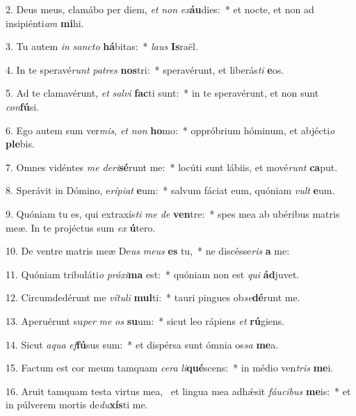 2. Deus meus, clamábo per diem, \textit{et} \textit{non} \textit{ex}\textbf{áu}dies:~*  et nocte, et non ad insipiénti\textit{am} \textbf{mi}hi.\

3. Tu autem \textit{in} \textit{sanc}\textit{to} \textbf{há}bitas:~*  \textit{laus} \textbf{Is}raël.\

4. In te speravé\textit{runt} \textit{pa}\textit{tres} \textbf{nos}tri:~*  speravérunt, et liberás\textit{ti} \textbf{e}os.\

5. Ad te clamavérunt, \textit{et} \textit{sal}\textit{vi} \textbf{fac}ti sunt:~*  in te speravérunt, et non sunt \textit{con}\textbf{fú}si.\

6. Ego autem sum ver\textit{mis}, \textit{et} \textit{non} \textbf{ho}mo:~*  oppróbrium hóminum, et abjécti\textit{o} \textbf{ple}bis.\

7. Omnes vidéntes \textit{me} \textit{de}\textit{ri}\textbf{sé}runt me:~*  locúti sunt lábiis, et mové\textit{runt} \textbf{ca}put.\

8. Sperávit in Dómino, e\textit{rí}\textit{pi}\textit{at} \textbf{e}um:~*  salvum fáciat eum, quóniam \textit{vult} \textbf{e}um.\

9. Quóniam tu es, qui extraxís\textit{ti} \textit{me} \textit{de} \textbf{ven}tre:~*  spes mea ab ubéribus matris meæ. In te projéctus sum \textit{ex} \textbf{ú}tero.\

10. De ventre matris meæ De\textit{us} \textit{me}\textit{us} \textbf{es} tu,~*  ne discésse\textit{ris} \textbf{a} me:\

11. Quóniam tribuláti\textit{o} \textit{pró}\textit{xi}\textbf{ma} est:~*  quóniam non est \textit{qui} \textbf{ád}juvet.\

12. Circumdedérunt me \textit{ví}\textit{tu}\textit{li} \textbf{mul}ti:~*  tauri pingues ob\textit{se}\textbf{dé}runt me.\

13. Aperuérunt su\textit{per} \textit{me} \textit{os} \textbf{su}um:~*  sicut leo rápiens \textit{et} \textbf{rú}giens.\

14. Sicut \textit{a}\textit{qua} \textit{ef}\textbf{fú}sus sum:~*  et dispérsa sunt ómnia os\textit{sa} \textbf{me}a.\

15. Factum est cor meum tamquam \textit{ce}\textit{ra} \textit{li}\textbf{qué}scens:~*  in médio ven\textit{tris} \textbf{me}i.\

16. Aruit tamquam testa virtus mea, \dag\  et lingua mea adhǽsit \textit{fáu}\textit{ci}\textit{bus} \textbf{me}is:~*  et in púlverem mortis de\textit{du}\textbf{xís}ti me.\

